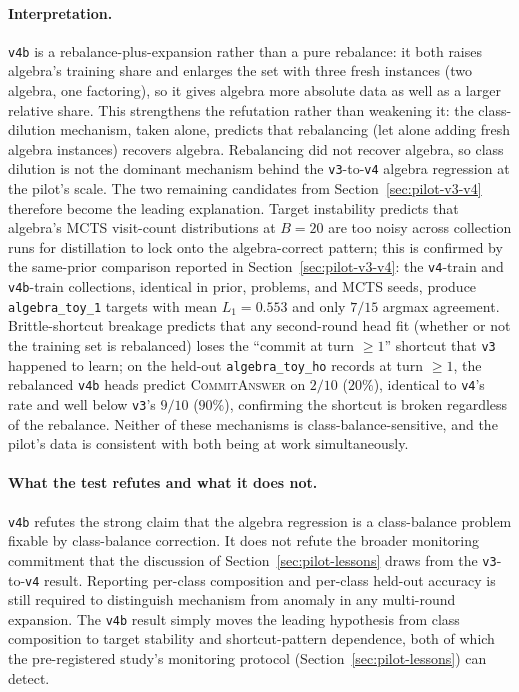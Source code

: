 \paragraph{Interpretation.} \texttt{v4b} is a rebalance-plus-expansion
rather than a pure rebalance: it both raises algebra's training share
and enlarges the set with three fresh instances (two algebra, one
factoring), so it gives algebra more absolute data as well as a larger
relative share. This strengthens the refutation rather than weakening
it: the class-dilution mechanism, taken
alone, predicts that rebalancing (let alone adding fresh algebra
instances) recovers algebra. Rebalancing did
not recover algebra, so class dilution is not the dominant mechanism
behind the \texttt{v3}-to-\texttt{v4} algebra regression at the
pilot's scale. The two remaining candidates from
Section~\ref{sec:pilot-v3-v4} therefore become the leading
explanation. Target instability predicts that algebra's MCTS
visit-count distributions at $B = 20$ are too noisy across collection
runs for distillation to lock onto the algebra-correct pattern; this
is confirmed by the same-prior comparison reported in
Section~\ref{sec:pilot-v3-v4}: the \texttt{v4}-train and
\texttt{v4b}-train collections, identical in prior, problems, and MCTS
seeds, produce \texttt{algebra\_toy\_1} targets with mean
$L_1 = 0.553$ and only $7/15$ argmax agreement. Brittle-shortcut breakage predicts
that any second-round head fit (whether or not the training set is
rebalanced) loses the ``commit at turn $\geq 1$'' shortcut that
\texttt{v3} happened to learn; on the held-out \texttt{algebra\_toy\_ho}
records at turn $\geq 1$, the rebalanced \texttt{v4b} heads predict
\textsc{CommitAnswer} on $2/10$ ($20\%$), identical to \texttt{v4}'s
rate and well below \texttt{v3}'s $9/10$ ($90\%$), confirming the
shortcut is broken regardless of the rebalance. Neither of these mechanisms is class-balance-sensitive,
and the pilot's data is consistent with both being at work
simultaneously.

\paragraph{What the test refutes and what it does not.} \texttt{v4b}
refutes the strong claim that the algebra regression is a class-balance
problem fixable by class-balance correction. It does not refute the
broader monitoring commitment that the discussion of
Section~\ref{sec:pilot-lessons} draws from the \texttt{v3}-to-\texttt{v4}
result. Reporting per-class composition and per-class held-out accuracy
is still required to distinguish mechanism from anomaly in any
multi-round expansion. The \texttt{v4b} result simply moves the leading
hypothesis from class composition to target stability and
shortcut-pattern dependence, both of which the pre-registered study's
monitoring protocol (Section~\ref{sec:pilot-lessons}) can detect.

